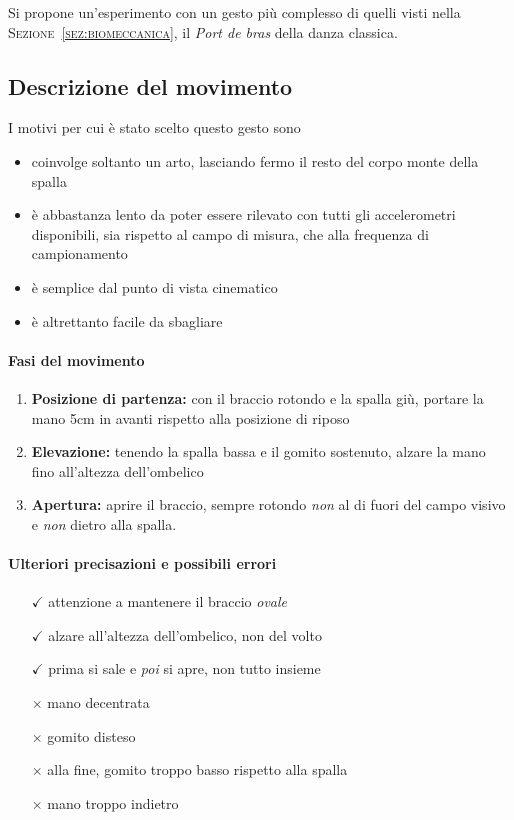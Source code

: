 Si propone un'esperimento con un gesto più complesso
di quelli visti nella \textsc{Sezione~\ref{sez:biomeccanica}},
il \textit{Port de bras} della danza classica.

\subsection{Descrizione del movimento} \label{ssez:descrizionedelmovimento}
I motivi per cui è stato scelto questo gesto sono  
\begin{itemize}
	\item coinvolge soltanto un arto, lasciando fermo il resto del corpo monte della spalla
    \item è abbastanza lento da poter essere rilevato con tutti gli accelerometri disponibili, sia rispetto al campo di misura, che alla frequenza di campionamento
    \item è semplice dal punto di vista cinematico
    \item è altrettanto facile da sbagliare
\end{itemize}

\paragraph{Fasi del movimento}
\begin{enumerate}
	\item \textbf{Posizione di partenza:} con il braccio rotondo e la spalla giù, portare la mano 5cm in avanti rispetto alla posizione di riposo
    \item \textbf{Elevazione:} tenendo la spalla bassa e il gomito sostenuto, alzare la mano fino all'altezza dell'ombelico
    \item \textbf{Apertura:} aprire il braccio, sempre rotondo \emph{non} al di fuori del campo visivo e \emph{non} dietro alla spalla.
\end{enumerate}

\paragraph{Ulteriori precisazioni e possibili errori}
\begin{itemize}
    \item [$\checkmark$] attenzione a mantenere il braccio \textit{ovale}
    \item [$\checkmark$] alzare all'altezza dell'ombelico, non del volto
    \item [$\checkmark$] prima si sale e \emph{poi} si apre, non tutto insieme
	\item[$\times$] mano decentrata
   	\item[$\times$] gomito disteso
	\item[$\times$] alla fine, gomito troppo basso rispetto alla spalla
   	\item[$\times$] mano troppo indietro
\end{itemize}







